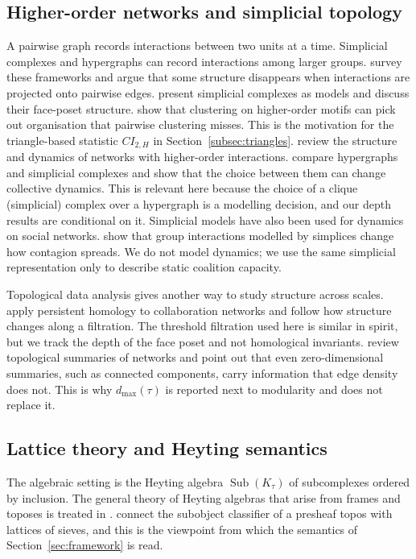 \documentclass[a4paper,fleqn,oneside]{cas-sc}
\theoremstyle{definition}
\theoremstyle{plain}
\newcommand{\Sub}{\operatorname{Sub}}
\begin{document}
\subsection{Higher-order networks and simplicial topology}

A pairwise graph records interactions between two units at a time. Simplicial
complexes and hypergraphs can record interactions among larger groups.
\citet{BattistonEtAl2020} survey these frameworks and argue that some
structure disappears when interactions are projected onto pairwise edges.
\citet{BianconiBianconi2021} present simplicial complexes as models and discuss
their face-poset structure. \citet{BensonGleichLeskovec2016} show that
clustering on higher-order motifs can pick out organisation that pairwise
clustering misses. This is the motivation for the triangle-based statistic
$CI_{2,H}$ in Section~\ref{subsec:triangles}. \citet{BoccalettiEtAl2023} review the structure and dynamics of networks with higher-order interactions. \citet{ZhangLucasBattiston2023} compare hypergraphs and simplicial complexes and show that the choice between them can change collective dynamics. This is relevant here because the choice of a clique (simplicial) complex over a hypergraph is a modelling decision, and our depth results are conditional on it.
Simplicial models have also been used for dynamics on social networks. \citet{IacopiniEtAl2019} show that group interactions modelled by simplices change how contagion spreads. We do not model dynamics; we use the same simplicial representation only to describe static coalition capacity.

Topological data analysis gives another way to study structure across scales.
\citet{PataniaEtAl2017} apply persistent homology to collaboration networks
and follow how structure changes along a filtration. The threshold filtration
used here is similar in spirit, but we track the depth of the face poset and
not homological invariants. \citet{GiustiBassett2016} review topological
summaries of networks and point out that even zero-dimensional summaries, such
as connected components, carry information that edge density does not. This
is why $d_{\max}(\tau)$ is reported next to modularity and does not replace it.

\subsection{Lattice theory and Heyting semantics}

The algebraic setting is the Heyting algebra $\Sub(K_\tau)$ of subcomplexes
ordered by inclusion. The general theory of Heyting algebras that arise from
frames and toposes is treated in \citet{Johnstone1982}.
\citet{MacLaneMoerdijk1992} connect the subobject classifier of a presheaf
topos with lattices of sieves, and this is the viewpoint from which the
semantics of Section~\ref{sec:framework} is read.
\end{document}
